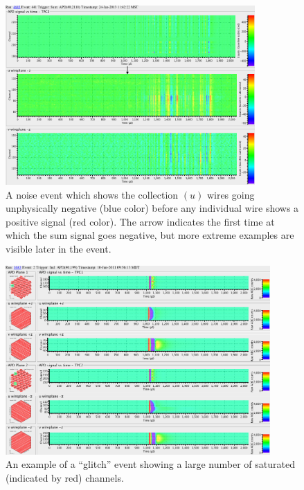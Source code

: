 \documentclass[herrin-thesis.tex]{subfiles}
\begin{document}
\begin{figure}
\centering
\includegraphics[width=0.85\textwidth]{./plots/noise_eventdisplay_run_4685_ev_0441_annotated.png}
\caption[Collection wires going negative noise]{A noise event which shows the collection \((u)\) wires going unphysically negative (blue color) before any individual wire shows a positive signal (red color). The arrow indicates the first time at which the sum signal goes negative, but more extreme examples are visible later in the event.}
\label{fig:noise_sum_u_neg}
\end{figure}

\begin{figure}
\centering
\includegraphics[width=0.9\textwidth]{./plots/noise_eventdisplay_run_1683_ev_0002.png}
\caption[``Glitch'' noise]{An example of a ``glitch'' event showing a large number of saturated (indicated by red) channels.}
\label{fig:noise_glitch}
\end{figure}
\end{document}
